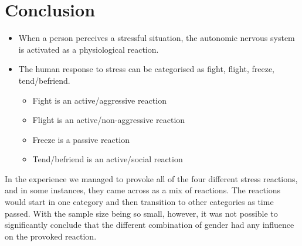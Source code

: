 \section{Conclusion}
\begin{itemize}
\item When a person perceives a stressful situation, the autonomic nervous system is  activated as a physiological reaction.
\item The human response to stress can be categorised as fight, flight, freeze, tend/befriend.
\begin{itemize}
\item Fight is an active/aggressive reaction
\item Flight is an active/non-aggressive reaction
\item Freeze is a passive reaction 
\item Tend/befriend is an active/social reaction
\end{itemize}
\end{itemize}

In the experience we managed to provoke all of the four different stress reactions, and in some instances, they came across as a mix of reactions. The reactions would start in one category and then transition to other categories as time passed. With the sample size being so small, however, it was not possible to significantly conclude that the different combination of gender had any influence on the provoked reaction.

